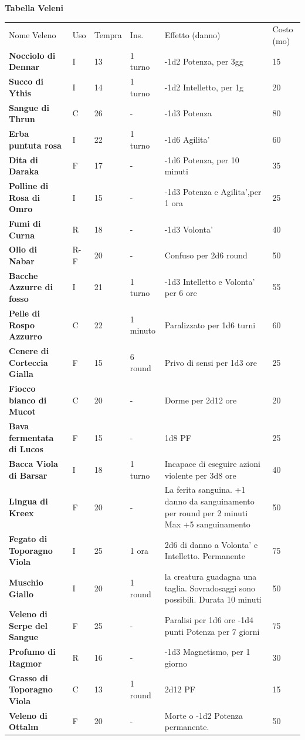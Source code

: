 \documentclass[a4paper,11pt,twoside,openany]{book}
\begin{document}
\textbf{Tabella Veleni}
\medskip
\begin{tabular}{L{4cm} |k{1cm}|k{1.5cm}| k{1.5cm} |k{5.5cm} |k{1.5cm}}
\toprule
Nome Veleno & Uso & Tempra & Ins. & Effetto (danno) & Costo (mo)\tabularnewline
\textbf{Nocciolo di Dennar}  & I & 13 & 1 turno & -1d2 Potenza, per 3gg & 15\tabularnewline
\textbf{Succo di Ythis} & I & 14 & 1 turno & -1d2 Intelletto, per 1g & 20\tabularnewline
\textbf{Sangue di Thrun}  & C & 26 & - & -1d3 Potenza & 80\tabularnewline
\textbf{Erba puntuta rosa}  & I & 22 & 1 turno & -1d6 Agilita' & 60\tabularnewline
\textbf{Dita di Daraka} & F & 17 & - & -1d6 Potenza, per 10 minuti & 35\tabularnewline
\textbf{Polline di Rosa di Omro} & I & 15 & - & -1d3 Potenza e Agilita',per 1 ora & 25\tabularnewline
\textbf{Fumi di Curna} & R & 18 & - & -1d3 Volonta' & 40\tabularnewline
\textbf{Olio di Nabar}  & R-F & 20 & - & Confuso per 2d6 round & 50\tabularnewline
\textbf{Bacche Azzurre di fosso}  & I & 21 & 1 turno & -1d3 Intelletto e Volonta' per 6 ore & 55\tabularnewline
\textbf{Pelle di Rospo Azzurro}  & C & 22 & 1 minuto & Paralizzato per 1d6 turni & 60\tabularnewline
\textbf{Cenere di Corteccia Gialla}  & F & 15 & 6 round & Privo di sensi per 1d3 ore & 25\tabularnewline
\textbf{Fiocco bianco di Mucot} & C & 20 & - & Dorme per 2d12 ore & 20\tabularnewline
\textbf{Bava fermentata di Lucos}  & F & 15 & - & 1d8 PF & 25\tabularnewline
\textbf{Bacca Viola di Barsar} & I & 18 & 1 turno & Incapace di eseguire azioni violente per 3d8 ore & 40\\
\textbf{Lingua di Kreex}  & F & 20 & - & La ferita sanguina. +1 danno da sanguinamento per round per 2 minuti Max +5 sanguinamento & 50 \\
\textbf{Fegato di Toporagno Viola} & I & 25 & 1 ora & 2d6 di danno a Volonta' e Intelletto. Permanente & 75\\
\textbf{Muschio Giallo}  & I & 20 & 1 round & la creatura guadagna una taglia. Sovradosaggi sono possibili. Durata 10 minuti & 50\tabularnewline
\textbf{Veleno di Serpe del Sangue}  & F & 25 & - & Paralisi per 1d6 ore -1d4 punti Potenza per 7 giorni & 75\\
\textbf{Profumo di Ragmor} & R & 16 & - & -1d3 Magnetismo, per 1 giorno & 30\tabularnewline
\textbf{Grasso di Toporagno Viola}  & C & 13 & 1 round & 2d12 PF & 15\tabularnewline
\textbf{Veleno di Ottalm} & F & 20 & - & Morte o -1d2 Potenza permanente. & 50\tabularnewline
\end{tabular}
\end{document}
